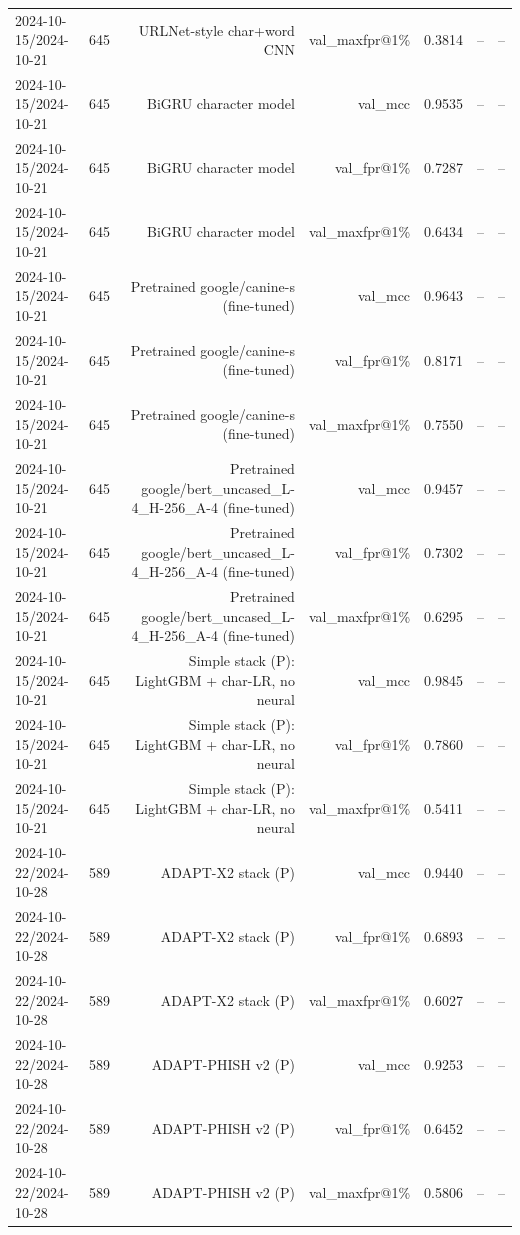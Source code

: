 \begin{table}[t]
\begin{tabular}{llrrrrr}
2024-10-15/2024-10-21 & 645 & URLNet-style char+word CNN & val\_maxfpr@1\% & 0.3814 & -- & -- \\
2024-10-15/2024-10-21 & 645 & BiGRU character model & val\_mcc & 0.9535 & -- & -- \\
2024-10-15/2024-10-21 & 645 & BiGRU character model & val\_fpr@1\% & 0.7287 & -- & -- \\
2024-10-15/2024-10-21 & 645 & BiGRU character model & val\_maxfpr@1\% & 0.6434 & -- & -- \\
2024-10-15/2024-10-21 & 645 & Pretrained google/canine-s (fine-tuned) & val\_mcc & 0.9643 & -- & -- \\
2024-10-15/2024-10-21 & 645 & Pretrained google/canine-s (fine-tuned) & val\_fpr@1\% & 0.8171 & -- & -- \\
2024-10-15/2024-10-21 & 645 & Pretrained google/canine-s (fine-tuned) & val\_maxfpr@1\% & 0.7550 & -- & -- \\
2024-10-15/2024-10-21 & 645 & Pretrained google/bert\_uncased\_L-4\_H-256\_A-4 (fine-tuned) & val\_mcc & 0.9457 & -- & -- \\
2024-10-15/2024-10-21 & 645 & Pretrained google/bert\_uncased\_L-4\_H-256\_A-4 (fine-tuned) & val\_fpr@1\% & 0.7302 & -- & -- \\
2024-10-15/2024-10-21 & 645 & Pretrained google/bert\_uncased\_L-4\_H-256\_A-4 (fine-tuned) & val\_maxfpr@1\% & 0.6295 & -- & -- \\
2024-10-15/2024-10-21 & 645 & Simple stack (P): LightGBM + char-LR, no neural & val\_mcc & 0.9845 & -- & -- \\
2024-10-15/2024-10-21 & 645 & Simple stack (P): LightGBM + char-LR, no neural & val\_fpr@1\% & 0.7860 & -- & -- \\
2024-10-15/2024-10-21 & 645 & Simple stack (P): LightGBM + char-LR, no neural & val\_maxfpr@1\% & 0.5411 & -- & -- \\
2024-10-22/2024-10-28 & 589 & ADAPT-X2 stack (P) & val\_mcc & 0.9440 & -- & -- \\
2024-10-22/2024-10-28 & 589 & ADAPT-X2 stack (P) & val\_fpr@1\% & 0.6893 & -- & -- \\
2024-10-22/2024-10-28 & 589 & ADAPT-X2 stack (P) & val\_maxfpr@1\% & 0.6027 & -- & -- \\
2024-10-22/2024-10-28 & 589 & ADAPT-PHISH v2 (P) & val\_mcc & 0.9253 & -- & -- \\
2024-10-22/2024-10-28 & 589 & ADAPT-PHISH v2 (P) & val\_fpr@1\% & 0.6452 & -- & -- \\
2024-10-22/2024-10-28 & 589 & ADAPT-PHISH v2 (P) & val\_maxfpr@1\% & 0.5806 & -- & -- \\

\end{tabular}
\end{table}
